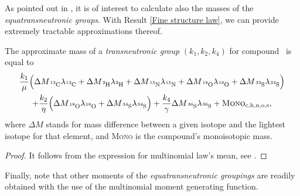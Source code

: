 As pointed out in \cite{Olson2009Calculations}, it is of interest to calculate also the masses of the 
{\it equatransneutronic groups}. With Result \ref{Fine structure law}, we can provide extremely tractable approximations thereof. 
\begin{result}\label{Equatransneutronic Masses result}
	The approximate mass of a \emph{ transneutronic group} $(k_1, k_2, k_4)$ for compound \molecule\, is equal to
	{\small
		\begin{equation}\label{Equatransneutronic masses eq}
		\begin{gathered}
			\frac{k_1}{\mu}
			\Big( 
				{\Delta M}_\cem{^{13}C} \lambda_\cem{^{13}C} 	+ 
				{\Delta M}_\cem{^{2}H} 	\lambda_\cem{^{2}H} 	+ 
				{\Delta M}_\cem{^{15}N} \lambda_\cem{^{15}N} 	+ 
				{\Delta M}_\cem{^{18}O} \lambda_\cem{^{18}O} 	+  
				{\Delta M}_\cem{^{33}S} \lambda_\cem{^{33}S} 
			\Big)\\
			+\frac{k_2}{\eta}
			\Big( 
				{\Delta M}_\cem{^{18}O} \lambda_\cem{^{18}O} 	+ 
				{\Delta M}_\cem{^{34}S} \lambda_\cem{^{34}S} 
			\Big) + 
			\frac{k_4}{\gamma} {\Delta M}_\cem{^{36}S} \lambda_\cem{^{36}S} + 
			\textsc{Mono}_{ \cem{c}, \cem{h}, \cem{n}, \cem{o}, \cem{s} }, 
		\end{gathered}		
		\end{equation}}
	where $\Delta M$ stands for mass difference between a given isotope and the lightest isotope for that element, and \textsc{Mono} is the compound's monoisotopic mass.   
\end{result}
\begin{proof}
	It follows from the expression for multinomial law's mean, see \cite{Roos1999OnTheRateOfMultivariatePoissonConvergence}.
\end{proof}

Finally, note that other moments of the {\it equatransneutronic groupings} are readily obtained with the use of the multinomial moment generating function. 